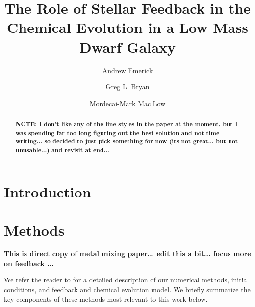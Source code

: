 \documentclass[twocolumn]{aastex62}
\begin{document}
\title{The Role of Stellar Feedback in the Chemical Evolution in a Low Mass Dwarf Galaxy}


\author[0000-0003-2807-328X]{Andrew Emerick}
\author[0000-0003-2630-9228]{Greg L. Bryan}
\author[0000-0003-0064-4060]{Mordecai-Mark Mac Low}




\begin{abstract}
\textbf{NOTE: I don't like any of the line styles in the paper at the moment, but I was spending far too long figuring out the best solution and not time writing... so decided to just pick something for now (its not great... but not unusable...) and revisit at end...}
\end{abstract}

\section{Introduction}


\section{Methods} 
\label{sec:methods}
\textbf{This is direct copy of metal mixing paper... edit this a bit... focus more on feedback ...}

We refer the reader to \cite{Emerick2019} for a detailed description of our numerical methods, initial conditions, and feedback and chemical evolution model. We briefly summarize the key components of these methods most relevant to this work below. 
\end{document}
